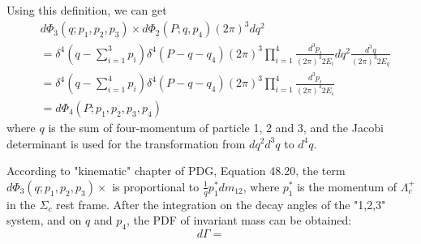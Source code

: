 \documentclass[12pt,a4paper]{article}
\begin{document}
Using this definition, we can get 
\begin{align*}
& d\Phi_3(q;p_1,p_2,p_3)\times d\Phi_2(P;q,p_4) (2\pi)^3 dq^2 \\
&= \delta^4(q-\sum_{i=1}^3 p_i) \delta^4(P-q-q_4) (2\pi)^3  \prod_{i=1}^4 \frac{d^3p_i}{(2\pi)^3 2E_i}  dq^2 \frac{d^3q}{(2\pi)^3 2E_q} \\
&= \delta^4(q-\sum_{i=1}^4 p_i) \delta^4(P-q-q_4) (2\pi)^3  \prod_{i=1}^4 \frac{d^3p_i}{(2\pi)^3 2E_i}  \\
&= d\Phi_4(P;p_1,p_2,p_3,p_4) 
\end{align*}
where $q$ is the sum of four-momentum of particle 1, 2 and 3, and the Jacobi determinant is used for the 
transformation from $dq^2 d^3q$ to $d^4q$.   

According to "kinematic" chapter of PDG, Equation 48.20, the term $d\Phi_3(q;p_1,p_2,p_3)\times$ is proportional 
to $\frac{1}{q} p_1^* dm_{12}$, where $p_1^*$ is the momentum of $\Lambda_c^+$ in the $\Sigma_c$ rest frame. After the 
integration on the decay angles of the "1,2,3" system, and on $q$ and $p_4$, the PDF of invariant mass can be obtained: 
\begin{equation}
d\Gamma  = 
\end{equation} 
\end{document}
